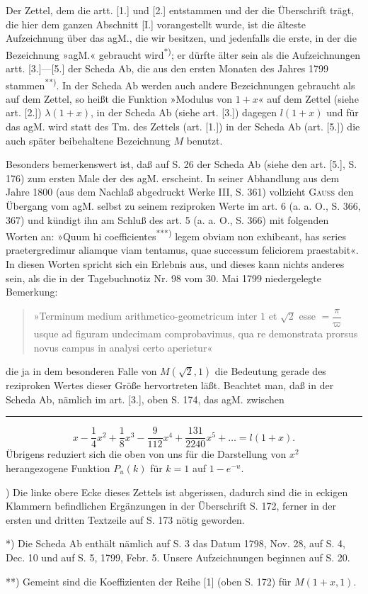 \par\indent Der Zettel, dem die artt. [1.] und [2.] entstammen und der die Überschrift trägt, die hier dem ganzen Abschnitt [I.] vorangestellt wurde, ist die älteste Aufzeichnung über das agM., die wir besitzen, und jedenfalls die erste, in der die Bezeichnung »agM.« gebraucht wird\textsuperscript{*)}; er dürfte älter sein als die Aufzeichnungen artt. [3.]—[5.] der Scheda Ab, die aus den ersten Monaten des Jahres 1799 stammen\textsuperscript{**)}. In der Scheda Ab werden auch andere Bezeichnungen gebraucht als auf dem Zettel, so heißt die Funktion »Modulus von $1+x$« auf dem Zettel (siehe art. [2.]) $\lambda(1+x)$, in der Scheda Ab (siehe art. [3.]) dagegen $l(1+x)$ und für das agM. wird statt des Tm. des Zettels (art. [1.]) in der Scheda Ab (art. [5.]) die auch später beibehaltene Bezeichnung $M$ benutzt.
\par\indent Besonders bemerkenswert ist, daß auf S. 26 der Scheda Ab (siehe den art. [5.], S. 176) zum ersten Male der  des agM. erscheint. In seiner Abhandlung aus dem Jahre 1800 (aus dem Nachlaß abgedruckt Werke III, S. 361) vollzieht \textsc{Gauss} den Übergang vom agM. selbst zu seinem reziproken Werte im art. 6 (a. a. O., S. 366, 367) und kündigt ihn am Schluß des art. 5 (a. a. O., S. 366) mit folgenden Worten an: »Quum hi coefficientes\textsuperscript{***)} legem obviam non exhibeant, has series praetergredimur aliamque viam tentamus, quae successum feliciorem praestabit«. In diesen Worten spricht sich ein Erlebnis aus, und dieses kann nichts anderes sein, als die in der Tagebuchnotiz Nr. 98 vom 30. Mai 1799 niedergelegte Bemerkung:
\begin{quote}»Terminum medium arithmetico-geometricum inter $1$ et $\surd2$ esse $=\dfrac\pi\varpi$ usque ad figuram undecimam comprobavimus, qua re demonstrata prorsus novus campus in analysi certo aperietur«\end{quote}
\noindent die ja in dem besonderen Falle von $M(\surd2,1)$ die Bedeutung gerade des reziproken Wertes dieser Größe hervortreten läßt. Beachtet man, daß in der Scheda Ab, nämlich im art. [3.], oben S. 174, das agM. zwischen
\par\smallskip\noindent\rule{.25\linewidth}{.4pt}\par
{\small
\[x-\frac14x^2+\frac18x^3-\frac9{112}x^4+\frac{131}{2240}x^5+\ldots=l(1+x).\]
\noindent Übrigens reduziert sich die oben von uns für die Darstellung von $x^2$ herangezogene Funktion $P_u(k)$ für $k=1$ auf $1-e^{-u}$.
\par\indent *) Die linke obere Ecke dieses Zettels ist abgerissen, dadurch sind die in eckigen Klammern befindlichen Ergänzungen in der Überschrift S. 172, ferner in der ersten und dritten Textzeile auf S. 173 nötig geworden.
\par\indent **) Die Scheda Ab enthält nämlich auf S. 3 das Datum 1798, Nov. 28, auf S. 4, Dec. 10 und auf S. 5, 1799, Febr. 5. Unsere Aufzeichnungen beginnen auf S. 20.
\par\indent ***) Gemeint sind die Koeffizienten der Reihe [1] (oben S. 172) für $M(1+x,1)$.
\par}
